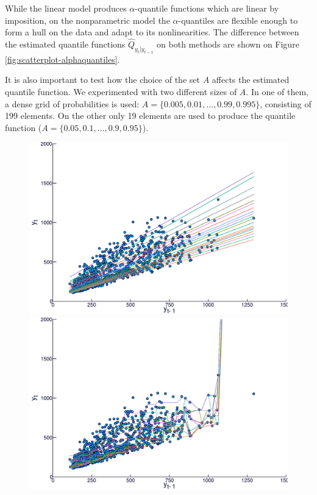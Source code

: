 While the linear model produces $\alpha$-quantile functions which are linear by imposition, on the nonparametric model the $\alpha$-quantiles are flexible enough to form a hull on the data and adapt to its nonlinearities. The difference between the estimated quantile functions $\hat{Q}_{y_t|y_{t-1}}$ on both methods are shown on Figure \ref{fig:scatterplot-alphaquantiles}.

It is also important to test how the choice of the set $A$ affects the estimated quantile function. We experimented with two different sizes of $A$. In one of them, a dense grid of probabilities is used:   $A=\{0.005, 0.01, \dots, 0.99, 0.995 \}$, consisting of 199 elements. On the other only 19 elements are used to produce the quantile function ($A=\{0.05, 0.1, \dots, 0.9, 0.95 \}$).

\begin{figure}
  \centering
  \begin{minipage}[t]{\linewidth}
    \centering
    \begin{minipage}[t]{0.45\linewidth}
      \centering     \includegraphics[width=\textwidth]{Figuras/regressao-quantilica/quantile-linear-scatter}
    \end{minipage}
    \begin{minipage}[t]{0.45\linewidth}
      \centering     \includegraphics[width=\textwidth]{Figuras/regressao-quantilica/quantile-nonpar-scatter}

\end{minipage}
\end{minipage}
\end{figure}

